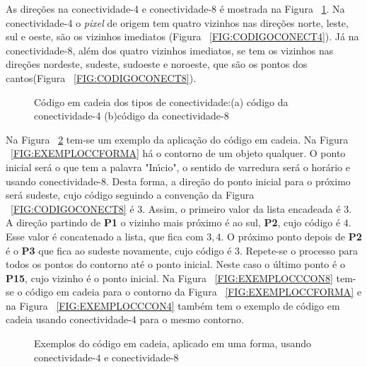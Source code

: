 As dire\c{c}\~{o}es na conectividade-4 e conectividade-8 \'{e} mostrada na Figura ~\ref{FIG:CODIGOCONECT}. Na conectividade-4 o \emph{pixel} 
de origem tem quatro vizinhos nas dire\c{c}\~{o}es norte, leste, sul e oeste, s\~{a}o os vizinhos imediatos (Figura ~\ref{FIG:CODIGOCONECT4}). 
J\'{a} na conectividade-8, al\'{e}m dos quatro vizinhos imediatos, se tem os vizinhos nas dire\c{c}\~{o}es nordeste, sudeste, sudoeste e noroeste, 
que s\~{a}o os pontos dos cantos(Figura ~\ref{FIG:CODIGOCONECT8})\cite{NIXON:2002}.


\begin{figure}[h]
\centering
{}
\caption[C\'{o}digo em cadeia dos tipos de conectividade]{C\'{o}digo em cadeia dos tipos de conectividade:(a) c\'{o}digo da conectividade-4 
(b)c\'{o}digo da conectividade-8} \label{FIG:CODIGOCONECT}
\end{figure}


Na Figura ~\ref{FIG:EXEMPLOCCODE} tem-se um exemplo da aplica\c{c}\~{a}o do c\'{o}digo em cadeia. Na Figura ~\ref{FIG:EXEMPLOCCFORMA} h\'{a} o 
contorno de um objeto qualquer. O ponto inicial ser\'{a} o que tem a palavra "In\'{\i}cio", o sentido de varredura ser\'{a} o hor\'{a}rio e usando 
conectividade-8. Desta forma, a dire\c{c}\~{a}o do ponto inicial para o pr\'{o}ximo ser\'{a} sudeste, cujo c\'{o}digo seguindo a conven\c{c}\~{a}o da Figura 
~\ref{FIG:CODIGOCONECT8} \'{e} $3$. Assim, o primeiro valor da lista encadeada \'{e} $3$. A dire\c{c}\~{a}o partindo de \textbf{P1} o vizinho mais 
pr\'{o}ximo \'{e} ao sul, \textbf{P2}, cujo c\'{o}digo \'{e} $4$. Esse valor \'{e} concatenado a lista, que fica com $3,4$. O pr\'{o}ximo ponto depois de 
\textbf{P2} \'{e} o \textbf{P3} que fica ao sudeste novamente, cujo c\'{o}digo \'{e} 3. Repete-se o processo para todos os pontos do contorno 
at\'{e} o ponto inicial. Neste caso o \'{u}ltimo ponto \'{e} o \textbf{P15}, cujo vizinho \'{e} o ponto inicial. Na Figura 
~\ref{FIG:EXEMPLOCCCON8} tem-se o c\'{o}digo em cadeia para o contorno da Figura ~\ref{FIG:EXEMPLOCCFORMA} e na Figura 
~\ref{FIG:EXEMPLOCCCON4} tamb\'{e}m tem o exemplo de c\'{o}digo em cadeia usando conectividade-4 para o mesmo contorno.

\begin{figure}[h]
\centering
{}
\caption[Exemplos do c\'{o}digo em cadeia aplicado em uma forma]{Exemplos do c\'{o}digo em cadeia, aplicado em uma forma, usando 
conectividade-$4$ e conectividade-$8$ } \label{FIG:EXEMPLOCCODE}

\end{figure}

